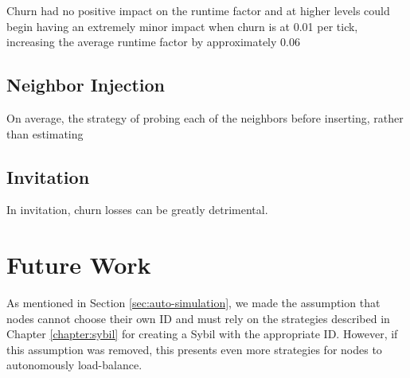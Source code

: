 Churn had no positive impact on the runtime factor and at higher levels could begin having an extremely minor impact when churn is at 0.01 per tick, increasing the average runtime factor by approximately 0.06 
\subsection{Neighbor Injection}


On average, the strategy of probing each of the neighbors before inserting, rather than estimating 
\subsection{Invitation}

In invitation, churn losses can be greatly detrimental.

\section{Future Work}

As mentioned in Section \ref{sec:auto-simulation}, we made the assumption that nodes cannot choose their own ID and must rely on the strategies described in Chapter \ref{chapter:sybil}  \cite{sybil-analysis} for creating a Sybil with the appropriate ID.
However, if this assumption was removed, this presents even more strategies for nodes to autonomously load-balance.